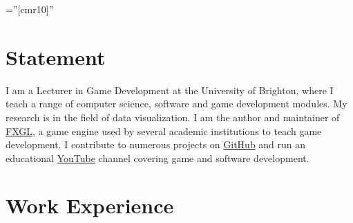 \documentclass[a4paper,11pt]{article} %
\begin{document}
\pagestyle{empty} %

\font\fb=''[cmr10]'' %


\par{\bigskip\par} %

\section{Statement}

I am a Lecturer in Game Development at the University of Brighton, where I teach a range of computer science, software and game development modules.
My research is in the field of data visualization.
I am the author and maintainer of \href{https://github.com/AlmasB/FXGL}{FXGL}, a game engine used by several academic institutions to teach game development.
I contribute to numerous projects on \href{https://github.com/AlmasB}{GitHub} and run an educational \href{https://www.youtube.com/almasb0/videos}{YouTube} channel covering game and software development.


\section{Work Experience}
\end{document}
